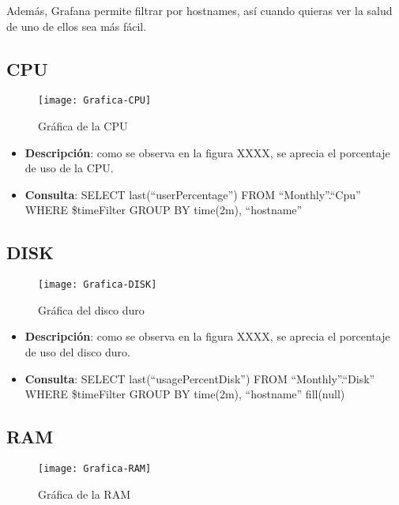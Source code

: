 \documentclass[ spanish, a4paper, 12pt, oneside]{report}
\begin{document}
Además, Grafana permite filtrar por hostnames, así cuando quieras ver la salud de uno de ellos sea más fácil.\\
\subsection{CPU}

\begin{figure}[!h]
   \centering
   \texttt{[image: Grafica-CPU]}\\
      \caption{\label{fig: Gráfica de la CPU} Gráfica de la CPU}
\end{figure}

\begin{itemize}
   \item \textbf{Descripción}: como se observa en la figura XXXX, se aprecia el porcentaje de uso de la CPU. 
   \item \textbf{Consulta}: SELECT last(``userPercentage'') FROM ``Monthly''.``Cpu'' WHERE \$timeFilter GROUP BY time(2m), ``hostname''
\end{itemize}


\subsection{DISK}

\begin{figure}[!h]
   \centering
   \texttt{[image: Grafica-DISK]}\\
      \caption{\label{fig: Gráfica del disco duro} Gráfica del disco duro}
\end{figure}

\begin{itemize}
   \item \textbf{Descripción}: como se observa en la figura XXXX, se aprecia el porcentaje de uso del disco duro. 
   \item \textbf{Consulta}: SELECT last(``usagePercentDisk'') FROM ``Monthly''.``Disk'' WHERE \$timeFilter GROUP BY time(2m), ``hostname'' fill(null)
\end{itemize}

\subsection{RAM}

\begin{figure}[!h]
   \centering
   \texttt{[image: Grafica-RAM]}\\
      \caption{\label{fig: Gráfica de la RAM} Gráfica de la RAM}
\end{figure}
\end{document}
